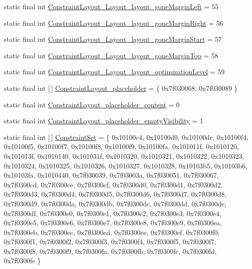 \begin{DoxyCompactItemize}
static final int \mbox{\hyperlink{classandroid_1_1support_1_1constraint_1_1_r_1_1styleable_aa68b4322dc31311470fbb33eb2657cb6}{Constraint\+Layout\+\_\+\+Layout\+\_\+layout\+\_\+gone\+Margin\+Left}} = 55
\item 
static final int \mbox{\hyperlink{classandroid_1_1support_1_1constraint_1_1_r_1_1styleable_a4f89a5e49b0c6aed4f6b95e5d3008cff}{Constraint\+Layout\+\_\+\+Layout\+\_\+layout\+\_\+gone\+Margin\+Right}} = 56
\item 
static final int \mbox{\hyperlink{classandroid_1_1support_1_1constraint_1_1_r_1_1styleable_a7e3a152bdd30e3f33255d15fd6955754}{Constraint\+Layout\+\_\+\+Layout\+\_\+layout\+\_\+gone\+Margin\+Start}} = 57
\item 
static final int \mbox{\hyperlink{classandroid_1_1support_1_1constraint_1_1_r_1_1styleable_ae93fdd158caa003a05fc74549b285e44}{Constraint\+Layout\+\_\+\+Layout\+\_\+layout\+\_\+gone\+Margin\+Top}} = 58
\item 
static final int \mbox{\hyperlink{classandroid_1_1support_1_1constraint_1_1_r_1_1styleable_a2f33800d079648c60015daaeca514ce6}{Constraint\+Layout\+\_\+\+Layout\+\_\+layout\+\_\+optimization\+Level}} = 59
\item 
static final int \mbox{[}$\,$\mbox{]} \mbox{\hyperlink{classandroid_1_1support_1_1constraint_1_1_r_1_1styleable_a55a5efe196fd60ee5adbd0df36245391}{Constraint\+Layout\+\_\+placeholder}} = \{ 0x7f030068, 0x7f030089 \}
\item 
static final int \mbox{\hyperlink{classandroid_1_1support_1_1constraint_1_1_r_1_1styleable_a69e2978769501e5e99c67a43802abc6d}{Constraint\+Layout\+\_\+placeholder\+\_\+content}} = 0
\item 
static final int \mbox{\hyperlink{classandroid_1_1support_1_1constraint_1_1_r_1_1styleable_ac980dc4b72a5457ce99757e82e5b01bb}{Constraint\+Layout\+\_\+placeholder\+\_\+empty\+Visibility}} = 1
\item 
static final int \mbox{[}$\,$\mbox{]} \mbox{\hyperlink{classandroid_1_1support_1_1constraint_1_1_r_1_1styleable_aa16c37eee601191a12a97dcf9222a0b9}{Constraint\+Set}} = \{ 0x10100c4, 0x10100d0, 0x10100dc, 0x10100f4, 0x10100f5, 0x10100f7, 0x10100f8, 0x10100f9, 0x10100fa, 0x101011f, 0x1010120, 0x101013f, 0x1010140, 0x101031f, 0x1010320, 0x1010321, 0x1010322, 0x1010323, 0x1010324, 0x1010325, 0x1010326, 0x1010327, 0x1010328, 0x10103b5, 0x10103b6, 0x10103fa, 0x1010440, 0x7f030039, 0x7f03003a, 0x7f030051, 0x7f030067, 0x7f0300cd, 0x7f0300ce, 0x7f0300cf, 0x7f0300d0, 0x7f0300d1, 0x7f0300d2, 0x7f0300d3, 0x7f0300d4, 0x7f0300d5, 0x7f0300d6, 0x7f0300d7, 0x7f0300d8, 0x7f0300d9, 0x7f0300da, 0x7f0300db, 0x7f0300dc, 0x7f0300dd, 0x7f0300de, 0x7f0300df, 0x7f0300e0, 0x7f0300e1, 0x7f0300e2, 0x7f0300e3, 0x7f0300e4, 0x7f0300e5, 0x7f0300e6, 0x7f0300e7, 0x7f0300e8, 0x7f0300e9, 0x7f0300ea, 0x7f0300eb, 0x7f0300ec, 0x7f0300ed, 0x7f0300ee, 0x7f0300ef, 0x7f0300f0, 0x7f0300f1, 0x7f0300f2, 0x7f0300f3, 0x7f0300f4, 0x7f0300f5, 0x7f0300f7, 0x7f0300f8, 0x7f0300f9, 0x7f0300fa, 0x7f0300fb, 0x7f0300fc, 0x7f0300fd, 0x7f0300fe \}

\end{DoxyCompactItemize}
